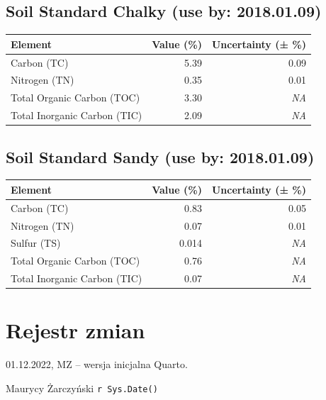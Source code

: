 \documentclass[
  letterpaper,
  DIV=11,
  numbers=noendperiod]{scrreprt}
\begin{document}
\hypertarget{soil-standard-chalky-use-by-2018.01.09}{%
\subsection{Soil Standard Chalky (use by:
2018.01.09)}\label{soil-standard-chalky-use-by-2018.01.09}}

\begin{longtable}[]{@{}lrr@{}}
\toprule\noalign{}
Element & Value (\%) & Uncertainty (± \%) \\
\midrule\noalign{}
\endhead
\bottomrule\noalign{}
\endlastfoot
Carbon (TC) & 5.39 & 0.09 \\
Nitrogen (TN) & 0.35 & 0.01 \\
Total Organic Carbon (TOC) & 3.30 & \emph{NA} \\
Total Inorganic Carbon (TIC) & 2.09 & \emph{NA} \\
\end{longtable}

\hypertarget{soil-standard-sandy-use-by-2018.01.09}{%
\subsection{Soil Standard Sandy (use by:
2018.01.09)}\label{soil-standard-sandy-use-by-2018.01.09}}

\begin{longtable}[]{@{}lrr@{}}
\toprule\noalign{}
Element & Value (\%) & Uncertainty (± \%) \\
\midrule\noalign{}
\endhead
\bottomrule\noalign{}
\endlastfoot
Carbon (TC) & 0.83 & 0.05 \\
Nitrogen (TN) & 0.07 & 0.01 \\
Sulfur (TS) & 0.014 & \emph{NA} \\
Total Organic Carbon (TOC) & 0.76 & \emph{NA} \\
Total Inorganic Carbon (TIC) & 0.07 & \emph{NA} \\
\end{longtable}

\hypertarget{pagebreak-rejestr-zmian}{%
\section{\texorpdfstring{\newpage{}Rejestr
zmian}{Rejestr zmian}}\label{pagebreak-rejestr-zmian}}

01.12.2022, MZ -- wersja inicjalna Quarto.

Maurycy Żarczyński \texttt{r\ Sys.Date()}
\end{document}
